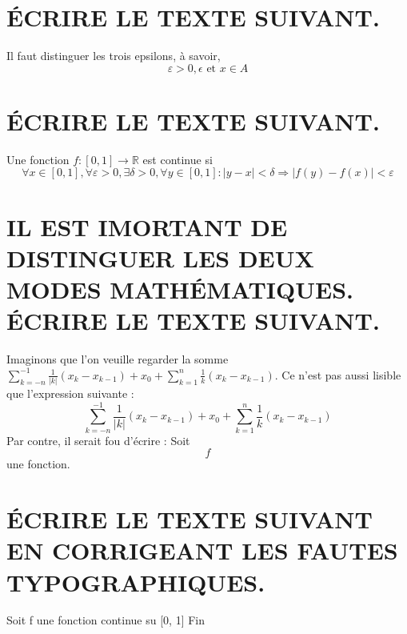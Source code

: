 \documentclass[12pt]{report}
\begin{document}
	
	\section{ÉCRIRE LE TEXTE SUIVANT.}
	\noindent Il faut distinguer les trois epsilons, à savoir,
	\[
		\varepsilon > 0, \epsilon \text{ et } x \in A
	\]
	
	\section{ÉCRIRE LE TEXTE SUIVANT.}
	\noindent Une fonction $ f : [0, 1] \to \mathbb{R} $ est continue si
	\[
		\forall x \in [0, 1], \forall \varepsilon > 0, \exists \delta > 0, \forall y \in [0, 1] : |y-x| < \delta \Rightarrow |f(y)-f(x)|<\varepsilon 
	\]
	
	\section{IL EST IMORTANT DE DISTINGUER LES DEUX MODES MATHÉMATIQUES.
		ÉCRIRE LE TEXTE SUIVANT.}
	\noindent Imaginons que l'on veuille regarder la somme $\sum_{k=-n}^{-1} \frac{1}{|k|} (x_k - x_{k-1}) + x_0 + \sum_{k=1}^{n} \frac{1}{k} (x_k-x_{k-1})$. Ce n'est pas aussi lisible que l'expression suivante :
	\[
		\sum_{k=-n}^{-1} \frac{1}{|k|} (x_k - x_{k-1}) + x_0 + \sum_{k=1}^{n} \frac{1}{k} (x_k-x_{k-1})
	\]
	Par contre, il serait fou d'écrire : Soit
	\[
		f
	\]
	une fonction.
	
	\section{ÉCRIRE LE TEXTE SUIVANT EN CORRIGEANT LES FAUTES TYPOGRAPHIQUES.}
	\noindent Soit f une fonction continue su [0, 1]
	Fin
\end{document}
